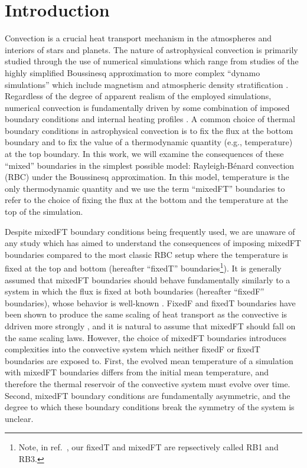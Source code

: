 \documentclass[aps, pre, onecolumn, nofootinbib, notitlepage, groupedaddress, amsfonts, amssymb, amsmath, longbibliography, superscriptaddress]{revtex4-1}
\newcommand{\RB}{Rayleigh-B\'{e}nard }
\begin{document}

\section{Introduction}
\label{sec:introduction}
Convection is a crucial heat transport mechanism in the atmospheres and interiors of stars and planets.
The nature of astrophysical convection is primarily studied through the use of numerical simulations which range from studies of the highly simplified Boussinesq approximation \cite{spiegel&veronis1960} to more complex ``dynamo simulations'' which include magnetism and atmospheric density stratification \cite{charbonneau2014, toomre2019}.
Regardless of the degree of apparent realism of the employed simulations, numerical convection is fundamentally driven by some combination of imposed boundary conditions and internal heating profiles \cite{goluskin2015}.
A common choice of thermal boundary conditions in astrophysical convection \cite{glatzmaier&gilman1982, hurlburt&all1986, cattaneo&all1990, featherstone&hindman2016a, korre&all2019, wood&brummell2018, kapyla&all2019} is to fix the flux at the bottom boundary and to fix the value of a thermodynamic quantity (e.g., temperature) at the top boundary.
In this work, we will examine the consequences of these ``mixed'' boundaries in the simplest possible model: \RB convection (RBC) under the Boussinesq approximation.
In this model, temperature is the only thermodynamic quantity and we use the term ``mixedFT'' boundaries to refer to the choice of fixing the flux at the bottom and the temperature at the top of the simulation.

Despite mixedFT boundary conditions being frequently used, we are unaware of any study which has aimed to understand the consequences of imposing mixedFT boundaries compared to the most classic RBC setup where the temperature is fixed at the top and bottom (hereafter ``fixedT'' boundaries\footnote{Note, in ref.~\cite{goluskin2015}, our fixedT and mixedFT are repsectively called RB1 and RB3.}).
It is generally assumed that mixedFT boundaries should behave fundamentally similarly to a system in which the flux is fixed at both boundaries (hereafter ``fixedF'' boundaries), whose behavior is well-known \cite{otero&all2002, goluskin2015}.
FixedF and fixedT boundaries have been shown to produce the same scaling of heat transport as the convective is ddriven more strongly \cite{johnston&doering2009}, and it is natural to assume that mixedFT should fall on the same scaling laws.
However, the choice of mixedFT boundaries introduces complexities into the convective system which neither fixedF or fixedT boundaries are exposed to.
First, the evolved mean temperature of a simulation with mixedFT boundaries differs from the initial mean temperature, and therefore the thermal reservoir of the convective system must evolve over time.
Second, mixedFT boundary conditions are fundamentally asymmetric, and the degree to which these boundary conditions break the symmetry of the system is unclear.
\end{document}
